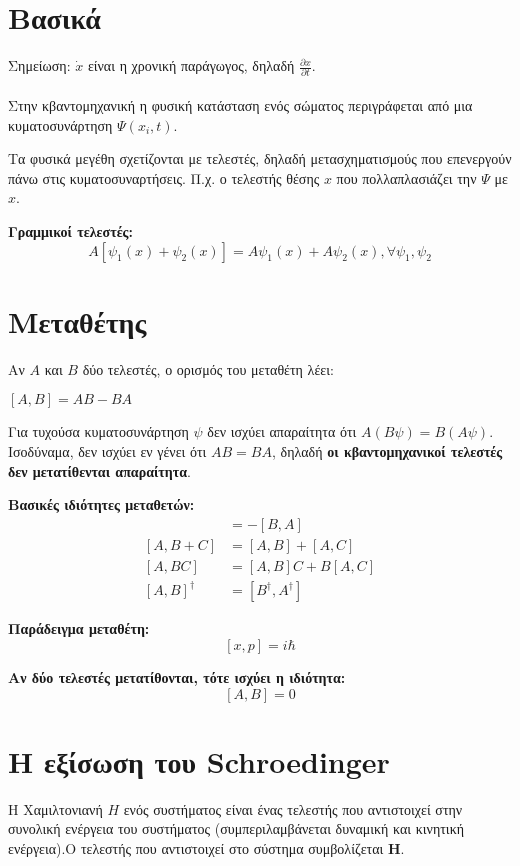 \documentclass[11pt, oneside]{article}   	%
\newcommand{\definition}[1]{
	\begin{tcolorbox}[colback=blue!5!white,colframe=blue!75!black,title=\textbf{Ορισμός}]
		\begin{center}
			#1
		\end{center}
	\end{tcolorbox}
}
\newcommand{\property}[1]{
	\begin{tcolorbox}[colback=red!5!white,colframe=red!75!black,title=\textbf{Ιδιότητα}]
		\begin{center}
			#1
		\end{center}
	\end{tcolorbox}
}
\newcommand{\suggestion}[1]{
	\begin{tcolorbox}[colback=green!5!white,colframe=green!75!black,title=\textbf{Πρόταση}]
		\begin{center}
			#1
		\end{center}
	\end{tcolorbox}
}
\begin{document}
\section{Βασικά}

Σημείωση: $\dot{x}$ είναι η χρονική παράγωγος, δηλαδή $\frac{\partial x}{\partial t}$.\\~\\

Στην κβαντομηχανική η φυσική κατάσταση ενός σώματος περιγράφεται από μια κυματοσυνάρτηση $\Psi(x_i,t)$.

Τα φυσικά μεγέθη σχετίζονται με τελεστές, δηλαδή μετασχηματισμούς που επενεργούν πάνω στις κυματοσυναρτήσεις. Π.χ. ο τελεστής θέσης $x$ που πολλαπλασιάζει την $\Psi$ με $x$.

\property{\textbf{Γραμμικοί τελεστές:}
	\[A[\psi_1(x) + \psi_2(x)]=A\psi_1(x)+A\psi_2(x), \forall \psi_1,\psi_2\]}
\section{Μεταθέτης}

Αν $A$ και $B$ δύο τελεστές, ο ορισμός του μεταθέτη λέει:

\definition{$[A,B] = AB-BA$}

Για τυχούσα κυματοσυνάρτηση $\psi$ δεν ισχύει απαραίτητα ότι $A(B\psi)=B(A\psi)$.
Ισοδύναμα, δεν ισχύει εν γένει ότι $AB=BA$, δηλαδή \textbf{οι κβαντομηχανικοί τελεστές δεν μετατίθενται απαραίτητα}.

\property{
	\textbf{Βασικές ιδιότητες μεταθετών:}
	\begin{align*}
		[A,B]&=-[B,A]\\
		[A,B+C]&=[A,B]+[A,C]\\
		[A,BC]&=[A,B]C+B[A,C]\\
		[Α,Β]^\dag &= [B^\dag,A^\dag]
	\end{align*}
	}
	
\suggestion{\textbf{Παράδειγμα μεταθέτη:}\[[x,p]=i\hbar\]}

\suggestion{\textbf{Αν δύο τελεστές μετατίθονται, τότε ισχύει η ιδιότητα:}
\[[A,B]=0\]}

\section{Η εξίσωση του Schroedinger}

Η Χαμιλτονιανή $H$ ενός συστήματος είναι ένας τελεστής που αντιστοιχεί στην συνολική ενέργεια του συστήματος (συμπεριλαμβάνεται δυναμική και κινητική ενέργεια).Ο τελεστής που αντιστοιχεί στο σύστημα συμβολίζεται $\mathbf{H}$.
\end{document}
